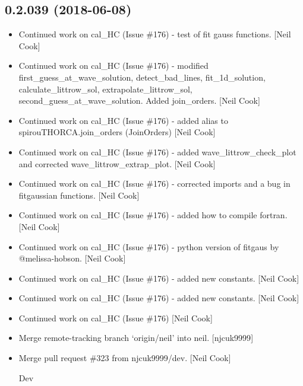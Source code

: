 \documentclass[a4paper,10pt,english]{report}
\begin{document}
\subsection{0.2.039 (2018-06-08)}
\label{\detokenize{misc/changelog:id423}}\begin{itemize}
\item {} 
Continued work on cal\_HC (Issue \#176) - test of fit gauss functions.
{[}Neil Cook{]}

\item {} 
Continued work on cal\_HC (Issue \#176) - modified
first\_guess\_at\_wave\_solution, detect\_bad\_lines, fit\_1d\_solution,
calculate\_littrow\_sol, extrapolate\_littrow\_sol,
second\_guess\_at\_wave\_solution. Added join\_orders. {[}Neil Cook{]}

\item {} 
Continued work on cal\_HC (Issue \#176) - added alias to
spirouTHORCA.join\_orders (JoinOrders) {[}Neil Cook{]}

\item {} 
Continued work on cal\_HC (Issue \#176) - added wave\_littrow\_check\_plot
and corrected wave\_littrow\_extrap\_plot. {[}Neil Cook{]}

\item {} 
Continued work on cal\_HC (Issue \#176) - corrected imports and a bug in
fitgaussian functions. {[}Neil Cook{]}

\item {} 
Continued work on cal\_HC (Issue \#176) - added how to compile fortran.
{[}Neil Cook{]}

\item {} 
Continued work on cal\_HC (Issue \#176) - python version of fitgaus by
@melissa-hobson. {[}Neil Cook{]}

\item {} 
Continued work on cal\_HC (Issue \#176) - added new constants. {[}Neil
Cook{]}

\item {} 
Continued work on cal\_HC (Issue \#176) - added new constants. {[}Neil
Cook{]}

\item {} 
Continued work on cal\_HC (Issue \#176) {[}Neil Cook{]}

\item {} 
Merge remote-tracking branch ‘origin/neil’ into neil. {[}njcuk9999{]}

\item {} 
Merge pull request \#323 from njcuk9999/dev. {[}Neil Cook{]}

Dev

\end{itemize}
\end{document}
